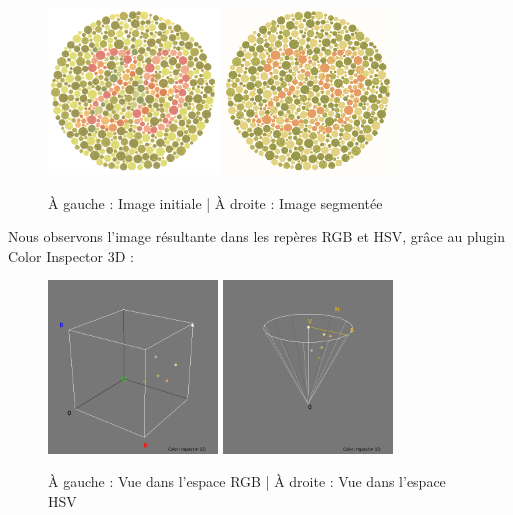 \documentclass[a4paper]{article}
\begin{document}
\begin{figure}[H]
\begin{center}
\includegraphics[width=170px]{../base/cas_4_dalton29.png}
\includegraphics[width=170px]{../resultats/cas_4_dalton29.png}
\end{center}
\caption{À gauche : Image initiale | À droite : Image segmentée}
\end{figure}

Nous observons l'image résultante dans les repères RGB et HSV, grâce au plugin Color Inspector 3D :

\begin{figure}[H]
\begin{center}
  \includegraphics[width=170px]{../resultats/cas_4_dalton29_rgb.png}
\includegraphics[width=170px]{../resultats/cas_4_dalton29_hsv.png}
\end{center}
\caption{À gauche : Vue dans l'espace RGB | À droite : Vue dans l'espace HSV}
\end{figure}
\end{document}
